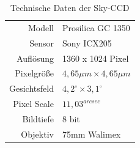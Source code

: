 \begin{table}[htbp]
\centering
\begin{tabular}{r|l}
\toprule
Modell & Prosilica GC 1350\\
Sensor & Sony ICX205\\
Auflösung & 1360 x 1024 Pixel \\
Pixelgröße & $4,65\unit{\mu m}\times 4,65\unit{\mu m}$\\
Gesichtsfeld & $4,2^{\circ} \times 3,1^{\circ} $\\
Pixel Scale & $11,03^{arcsec}$\\
Bildtiefe & 8 bit\\
Objektiv & 75mm Walimex\\
\bottomrule
\end{tabular}
\caption{Technische Daten der Sky-CCD \cite{Prosilica}}
\label{tab:SkyCCD}
\end{table}




